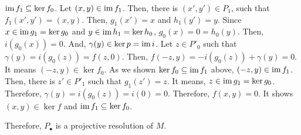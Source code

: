 \(\textnormal{im}\, f_1 \subseteq \ker f_0\).
Let \((x, y) \in \textnormal{im}\, f_1\).
Then, there is \((x', y') \in P_1\), such that \(f_1(x', y') = (x, y)\).
Then, \(g_1(x') = x\) and \(h_1(y') = y\).
Since \(x \in \textnormal{im}\, g_1 = \ker g_0\) and \(y \in \textnormal{im}\, h_1 = \ker h_0\), 
\(g_0(x) = 0 = h_0(y)\).
Then, \(i(g_0(x)) = 0\).
And, \(\gamma(y) \in \ker p = \textnormal{im}\, i\).
Let \(z \in P'_0\) such that
\(\gamma(y) = i(g_0(z)) = f(z, 0)\).
Then, \(f(-z, y) = -i(g_0(z)) + \gamma(y) = 0\).
It means \((-z, y) \in \ker f_0\).
As we shown \(\ker f_0 \subseteq \textnormal{im}\, f_1\) above, \((-z, y) \in \textnormal{im}\, f_1\).
Then, there is \(z' \in P'_1\) such that \(g_1(z') = z\).
It means, \(z \in \textnormal{im}\, g_1 = \ker g_0\).
Therefore, \(\gamma(y) = i(g_0(z)) = i(0) = 0\).
Therefore, \(f(x, y) = 0\).
It shows \((x, y) \in \ker f\) and \(\textnormal{im}\, f_1 \subseteq \ker f_0\).

\br
\noindent
Therefore, \(P_\bullet\) is a projective resolution of \(M\).
\qedsq